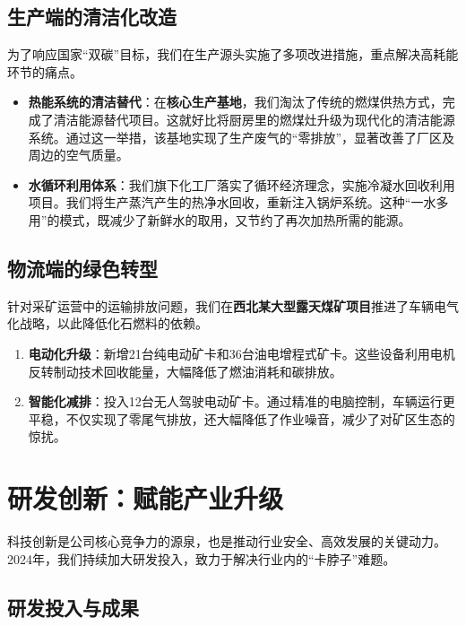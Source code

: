 \documentclass[a4paper,12pt]{article}
\begin{document}
\subsection{生产端的清洁化改造}

为了响应国家“双碳”目标，我们在生产源头实施了多项改进措施，重点解决高耗能环节的痛点。

\begin{itemize}
    \item \textbf{热能系统的清洁替代}：在\textbf{核心生产基地}，我们淘汰了传统的燃煤供热方式，完成了清洁能源替代项目。这就好比将厨房里的燃煤灶升级为现代化的清洁能源系统。通过这一举措，该基地实现了生产废气的“零排放”，显著改善了厂区及周边的空气质量。
    \item \textbf{水循环利用体系}：我们旗下化工厂落实了循环经济理念，实施冷凝水回收利用项目。我们将生产蒸汽产生的热净水回收，重新注入锅炉系统。这种“一水多用”的模式，既减少了新鲜水的取用，又节约了再次加热所需的能源。
\end{itemize}

\subsection{物流端的绿色转型}

针对采矿运营中的运输排放问题，我们在\textbf{西北某大型露天煤矿项目}推进了车辆电气化战略，以此降低化石燃料的依赖。

\begin{enumerate}
    \item \textbf{电动化升级}：新增21台纯电动矿卡和36台油电增程式矿卡。这些设备利用电机反转制动技术回收能量，大幅降低了燃油消耗和碳排放。
    \item \textbf{智能化减排}：投入12台无人驾驶电动矿卡。通过精准的电脑控制，车辆运行更平稳，不仅实现了零尾气排放，还大幅降低了作业噪音，减少了对矿区生态的惊扰。
\end{enumerate}

\section{研发创新：赋能产业升级}

科技创新是公司核心竞争力的源泉，也是推动行业安全、高效发展的关键动力。2024年，我们持续加大研发投入，致力于解决行业内的“卡脖子”难题。

\subsection{研发投入与成果}
\end{document}
